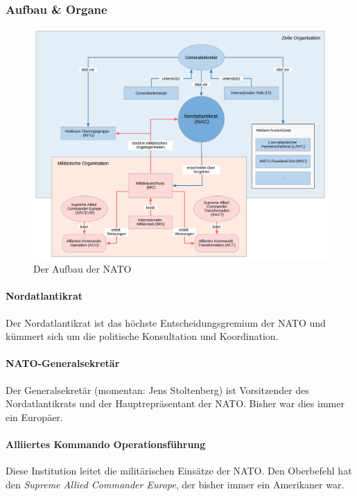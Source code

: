 \documentclass{article}
\begin{document}
	\newpage

	\subsubsection{Aufbau \& Organe}

	\begin{figure}[!ht]
		\centering
  		\includegraphics[width=45em]{nato_aufbau.png}
  		\caption{Der Aufbau der NATO}
  		\label{fig:nato_aufbau}
	\end{figure}

	\paragraph{Nordatlantikrat}
	Der Nordatlantikrat ist das höchste Entscheidungsgremium der NATO und kümmert sich um die politische Konsultation und Koordination.

	\paragraph{NATO-Generalsekretär}
	Der Generalsekretär (momentan: Jens Stoltenberg) ist Vorsitzender des Nordatlantikrats und der Hauptrepräsentant der NATO. Bisher war dies immer ein Europäer.

	\paragraph{Alliiertes Kommando Operationsführung}
	Diese Institution leitet die militärischen Einsätze der NATO. Den Oberbefehl hat den \textit{Supreme Allied Commander Europe}, der bisher immer ein Amerikaner war.
\end{document}
